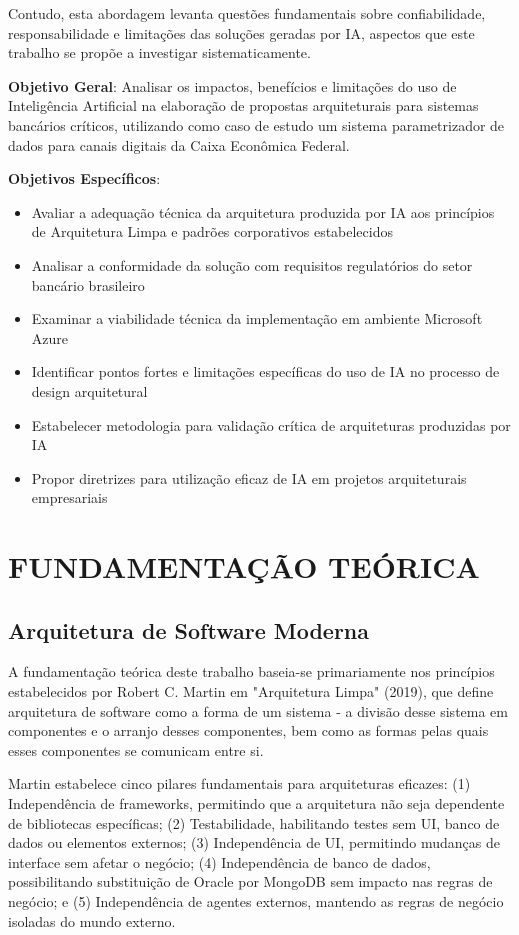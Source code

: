 Contudo, esta abordagem levanta questões fundamentais sobre confiabilidade, responsabilidade e limitações das soluções geradas por IA, aspectos que este trabalho se propõe a investigar sistematicamente.

\textbf{Objetivo Geral}: Analisar os impactos, benefícios e limitações do uso de Inteligência Artificial na elaboração de propostas arquiteturais para sistemas bancários críticos, utilizando como caso de estudo um sistema parametrizador de dados para canais digitais da Caixa Econômica Federal.

\textbf{Objetivos Específicos}:

\begin{itemize}
\item Avaliar a adequação técnica da arquitetura produzida por IA aos princípios de Arquitetura Limpa e padrões corporativos estabelecidos
\item Analisar a conformidade da solução com requisitos regulatórios do setor bancário brasileiro
\item Examinar a viabilidade técnica da implementação em ambiente Microsoft Azure
\item Identificar pontos fortes e limitações específicas do uso de IA no processo de design arquitetural
\item Estabelecer metodologia para validação crítica de arquiteturas produzidas por IA
\item Propor diretrizes para utilização eficaz de IA em projetos arquiteturais empresariais
\end{itemize}

\chapter{FUNDAMENTAÇÃO TEÓRICA}

\section{Arquitetura de Software Moderna}

A fundamentação teórica deste trabalho baseia-se primariamente nos princípios estabelecidos por Robert C. Martin em "Arquitetura Limpa" (2019), que define arquitetura de software como a forma de um sistema - a divisão desse sistema em componentes e o arranjo desses componentes, bem como as formas pelas quais esses componentes se comunicam entre si.

Martin estabelece cinco pilares fundamentais para arquiteturas eficazes: (1) Independência de frameworks, permitindo que a arquitetura não seja dependente de bibliotecas específicas; (2) Testabilidade, habilitando testes sem UI, banco de dados ou elementos externos; (3) Independência de UI, permitindo mudanças de interface sem afetar o negócio; (4) Independência de banco de dados, possibilitando substituição de Oracle por MongoDB sem impacto nas regras de negócio; e (5) Independência de agentes externos, mantendo as regras de negócio isoladas do mundo externo.

